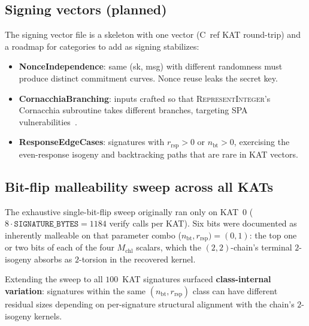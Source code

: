 \subsection{Signing vectors (planned)}

The signing vector file is a skeleton with one vector (C~ref KAT
round-trip) and a roadmap for categories to add as signing stabilizes:
\begin{itemize}[nosep]
  \item \textbf{NonceIndependence}: same (sk, msg) with different
    randomness must produce distinct commitment curves.  Nonce reuse
    leaks the secret key.
  \item \textbf{CornacchiaBranching}: inputs crafted so that
    \textsc{RepresentInteger}'s Cornacchia subroutine takes different
    branches, targeting SPA
    vulnerabilities~\cite{EPRINT:MCJKR25}.
  \item \textbf{ResponseEdgeCases}: signatures with $r_{\mathrm{rsp}}
    > 0$ or $n_{\mathrm{bt}} > 0$, exercising the even-response
    isogeny and backtracking paths that are rare in KAT vectors.
\end{itemize}

\subsection{Bit-flip malleability sweep across all KATs}
\label{sec:bit-flip-sweep}

The exhaustive single-bit-flip sweep originally ran only on KAT~0
($8 \cdot \texttt{SIGNATURE\_BYTES} = 1184$ verify calls per KAT).
Six bits were documented as inherently malleable on that
parameter combo
($n_{\mathrm{bt}}, r_{\mathrm{rsp}}) = (0, 1)$: the top one or two
bits of each of the four $M_{\mathrm{chl}}$ scalars, which the
$(2,2)$-chain's terminal $2$-isogeny absorbs as $2$-torsion in the
recovered kernel.

Extending the sweep to all $100$~KAT signatures surfaced
\textbf{class-internal variation}: signatures within the same
$(n_{\mathrm{bt}}, r_{\mathrm{rsp}})$ class can have different
residual sizes depending on per-signature structural alignment with
the chain's $2$-isogeny kernels.

